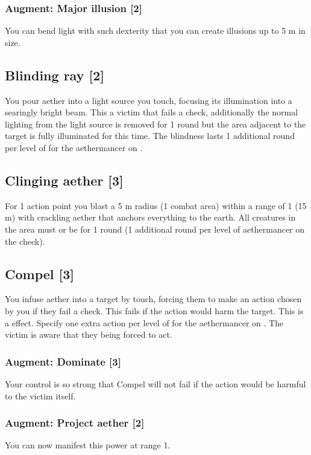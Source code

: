 \subsubsection{Augment: Major illusion [2]}
You can bend light with such dexterity that you can create illusions up to 5 m in size. 


\subsection{Blinding ray [2]}
\label{spell:blind-ray}
You pour aether into a light source you touch, focusing its illumination into a searingly bright beam. This  a victim that fails a  check, additionally the normal lighting from the light source is removed for 1 round but the area adjacent to the target is fully illuminated for this time. The blindness lasts 1 additional round per level of  for the aethermancer on .


\subsection{Clinging aether [3]}
For 1 action point you blast a 5 m radius (1 combat area) within a range of 1 (15 m) with crackling aether that anchors everything to the earth. All creatures in the area must  or be  for 1 round (1 additional round per level of aethermancer  on the  check).


\subsection{Compel [3]}
You infuse aether into a target by touch, forcing them to make an action chosen by you if they fail a  check. This fails if the action would harm the target. This is a  effect. Specify one extra action per level of  for the aethermancer on . The victim is aware that they being forced to act.
\subsubsection{Augment: Dominate [3]}
Your control is so strong that Compel will not fail if the action would be harmful to the victim itself.
\subsubsection{Augment: Project aether [2]}
You can now manifest this power at range 1.


